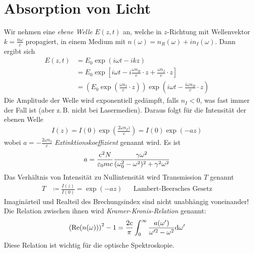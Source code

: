 \section{Absorption von Licht}
Wir nehmen eine \emph{ebene Welle $E(z,t)$} an, welche in $z$-Richtung
mit Wellenvektor $k=\frac{n\omega}{c}$ propagiert, in einem Medium mit
$n(\omega)=n_R(\omega)+in_I(\omega)$.
Dann ergibt sich
\begin{align*}
  E(z,t) &= E_0\exp(i\omega t-ikz) \\
         &= E_0\exp\left[
           i\omega t - i\frac{\omega n_R}{c}\cdot z 
           + \frac{\omega n_I}{c}\cdot z
           \right]\\
         &= \left( 
           E_0\exp\left(\frac{\omega n_I}{c}\cdot z\right)
           \right)
           \exp\left( i\omega t-\frac{i\omega n_R}{c}\cdot z\right)
\end{align*}
Die Amplitude der Welle wird exponentiell gedämpft, falls $n_I<0$, was
fast immer der Fall ist (aber z.\,B. nicht bei Lasermedien). Daraus
folgt für die Intensität der ebenen Welle
\begin{gather*}
  I(z) = I(0)\exp\left(\frac{2\omega n_I z}{c}\right)
  = I(0) \exp(-az)
\end{gather*}
wobei $a=-\frac{2\omega n_I}{c}$
\emph{Extinktionskoeffizient}%
%
genannt wird. Es ist
\begin{gather*}
  a = \frac{e^2N}{\varepsilon_0 mc}        
  \frac{\gamma\omega^2}{(\omega_0^2-\omega^2)^2 + \gamma^2\omega^2}
\end{gather*}
Das Verhältnis von Intensität zu Nullintensität wird 
Transmission $T$%
%
%
genannt
\begin{align*}
  T &\coloneqq \frac{I(z)}{I(0)} = \exp(-az)
  &&\text{Lambert-Beersches Gesetz}
\end{align*}
 Imaginärteil und Realteil des Brechungsindex sind nicht
unabhängig voneinander! Die Relation zwischen ihnen wird
\emph{Kramer-Kronis-Relation}
genannt:
\begin{gather*}
  \left(\operatorname{Re}(n(\omega))\right)^2 - 1
  = \frac{2c}{\pi} \int_0^\infty
  \frac{a(\omega')}{\omega'^2-\omega^2}\mathrm{d} \omega'
\end{gather*}
Diese Relation ist wichtig für die optische Spektroskopie.

